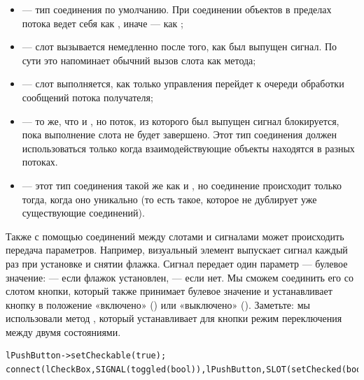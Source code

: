 \begin{itemize}
\item {} --- тип соединения по умолчанию. При соединении объектов в пределах потока ведет
себя как , иначе --- как ;
\item {} --- слот вызывается немедленно после того, как был выпущен сигнал. По сути это
напоминает обычний вызов слота как метода;
\item {} --- слот выполняется, как только управления перейдет к очереди обработки
сообщений потока получателя;
\item {} --- то же, что и , но поток, из которого был
выпущен сигнал блокируется, пока выполнение слота не будет завершено. Этот тип соединения должен использоваться только
когда взаимодействующие объекты находятся в разных потоках.
\item {} --- этот тип соединения такой же как и , но
соединение происходит только тогда, когда оно уникально (то есть такое, которое не дублирует уже существующие
соединений).
\end{itemize}
Также с помощью соединений между слотами и сигналами может происходить передача параметров. Например, визуальный элемент
 выпускает сигнал  каждый раз при установке и снятии флажка.
Сигнал  передает один параметр --- булевое значение:  --- если флажок установлен, 
 --- если нет.
Мы сможем соединить его со слотом  кнопки, который также принимает булевое значение и
устанавливает кнопку в положение «включено» () или «выключено» (). Заметьте: мы использовали метод
, который устанавливает для кнопки режим переключения между двумя состояниями.
\begin{lstlisting}
lPushButton->setCheckable(true);
connect(lCheckBox,SIGNAL(toggled(bool)),lPushButton,SLOT(setChecked(bool)));
\end{lstlisting}


